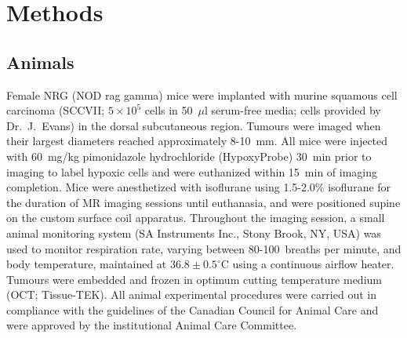 \section{Methods}
\subsection{Animals}
Female NRG (NOD rag gamma) mice were implanted with murine squamous cell carcinoma (SCCVII; $5\times 10^5$ cells in 50~$\mu$l serum-free media; cells provided by Dr.\ J.\ Evans) in the dorsal subcutaneous region.
Tumours were imaged when their largest diameters reached approximately 8-10~mm.
All mice were injected with 60~mg/kg pimonidazole hydrochloride (HypoxyProbe) 30~min prior to imaging to label hypoxic cells and were euthanized within 15~min of imaging completion.
Mice were anesthetized with isoflurane using 1.5-2.0\% isoflurane for the duration of MR imaging sessions until euthanasia, and were positioned supine on the custom surface coil apparatus.
Throughout the imaging session, a small animal monitoring system (SA Instruments Inc., Stony Brook, NY, USA) was used to monitor respiration rate, varying between 80-100~breaths per minute, and body temperature, maintained at ${36.8\pm 0.5^\circ}$C using a continuous airflow heater. 
Tumours were embedded and frozen in optimum cutting temperature medium (OCT; Tissue-TEK).
All animal experimental procedures were carried out in compliance with the guidelines of the Canadian Council for Animal Care and were approved by the institutional Animal Care Committee.

